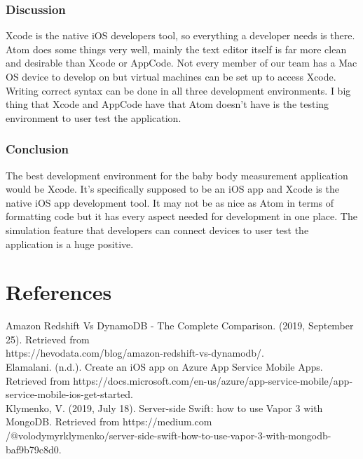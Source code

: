 \documentclass[letterpaper,10pt,draftclsnofoot,onecolumn,compsoc]{IEEEtran}
\begin{document}
\subsubsection{Discussion}
\begin{singlespace}
\noindent
Xcode is the native iOS developers tool, so everything a developer needs is there. Atom does some things very well, mainly the text editor itself is far more clean and desirable than Xcode or AppCode. Not every member of our team has a Mac OS device to develop on but virtual machines can be set up to access Xcode. Writing correct syntax can be done in all three development environments. I big thing that Xcode and AppCode have that Atom doesn't have is the testing environment to user test the application.
\end{singlespace}

\subsubsection{Conclusion}
\begin{singlespace}
\noindent
The best development environment for the baby body measurement application would be Xcode. It's specifically supposed to be an iOS app and Xcode is the native iOS app development tool. It may not be as nice as Atom in terms of formatting code but it has every aspect needed for development in one place. The simulation feature that developers can connect devices to user test the application is a huge positive.
\end{singlespace}

\newpage

\section{References}
\doublespacing
Amazon Redshift Vs DynamoDB - The Complete Comparison. (2019, September 25). Retrieved from \\ https://hevodata.com/blog/amazon-redshift-vs-dynamodb/.\\ 

Elamalani. (n.d.). Create an iOS app on Azure App Service Mobile Apps. Retrieved from https://docs.microsoft.com/en-us/azure/app-service-mobile/app-service-mobile-ios-get-started.\\ 

Klymenko, V. (2019, July 18). Server-side Swift: how to use Vapor 3 with MongoDB. Retrieved from https://medium.com\\/@volodymyrklymenko/server-side-swift-how-to-use-vapor-3-with-mongodb-baf9b79c8d0.\\ 
\end{document}
